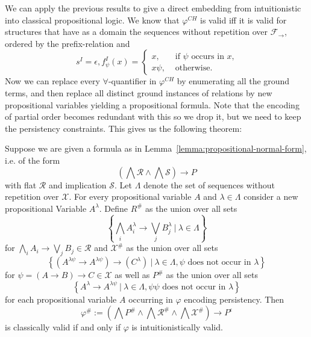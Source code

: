 \documentclass[runningheads]{llncs}
\begin{document}
We can apply the previous results to give a direct embedding from intuitionistic into classical propositional logic. We know that $\varphi^{CH}$ is valid iff it is valid for structures that have as a domain the sequences without repetition over $\mathcal F_\to$, ordered by the prefix-relation and $$s^I = \epsilon, f_\psi^I(x) = \begin{cases}
	x, &\text{ if $\psi$ occurs in $x$,}\\
	x\psi, &\text{ otherwise.}
\end{cases}$$
Now we can replace every $\forall$-quantifier in $\varphi^{CH}$ by enumerating all the ground terms, and then replace all distinct ground instances of relations by new propositional variables yielding a propositional formula. Note that the encoding of partial order becomes redundant with this so we drop it, but we need to keep the persistency constraints. This gives us the following theorem:

\begin{theorem}
	Suppose we are given a formula as in Lemma~\ref{lemma:propositional-normal-form}, i.e. of the form
	$$\left(\bigwedge\mathcal R\wedge\bigwedge\mathcal S\right)\to P$$
	with flat $\mathcal R$ and implication $\mathcal S$. Let $\Lambda$ denote the set of sequences without repetition over $\mathcal X$. For every propositional variable $A$ and $\lambda\in\Lambda$ consider a new propositional Variable $A^\lambda$. Define $R^\#$ as the union over all sets
	$$
		\left\{\bigwedge_iA_i^\lambda\to\bigvee_jB_j^\lambda\:|\:\lambda\in\Lambda\right\}
	$$
	for $\bigwedge_iA_i\to\bigvee_jB_j\in\mathcal R$ and $\mathcal X^\#$ as the union over all sets
	$$
		\left\{\left(A^{\lambda\psi} \to A^{\lambda\psi}\right)\to(C^\lambda)\:|\:\lambda\in\Lambda, \psi\text{ does not occur in }\lambda\right\}
	$$
	for $\psi = (A\to B)\to C\in\mathcal X$ as well as $P^\#$ as the union over all sets
	$$
		\left\{A^\lambda\to A^{\lambda\psi}\:|\:\lambda\in\Lambda, \psi\psi\text{ does not occur in }\lambda\right\}
	$$
	 for each propositional variable $A$ occurring in $\varphi$ encoding persistency. Then
	$$
		\varphi^\# := \left(\bigwedge P^\#\wedge\bigwedge \mathcal R^\#\wedge\bigwedge\mathcal X^\#\right)\to P^\epsilon
	$$
	is classically valid if and only if $\varphi$ is intuitionistically valid.
\end{theorem}
\end{document}
